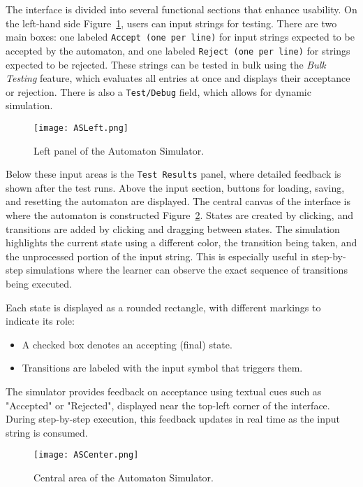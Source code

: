The interface is divided into several functional sections that enhance usability. 
On the left-hand side Figure~\ref{fig:automaton-simulator-left-panel}, users can input strings for testing. 
There are two main boxes: one labeled \texttt{Accept (one per line)} for input strings expected to be accepted by the automaton, 
and one labeled \texttt{Reject (one per line)} for strings expected to be rejected. 
These strings can be tested in bulk using the \textit{Bulk Testing} feature, which evaluates all entries at once and displays their acceptance or rejection.
There is also a \texttt{Test/Debug} field, which allows for dynamic simulation.

\begin{figure}[H]
  \centering
  \texttt{[image: ASLeft.png]}
  \caption{Left panel of the Automaton Simulator.}
  \label{fig:automaton-simulator-left-panel}
\end{figure}

Below these input areas is the \texttt{Test Results} panel, where detailed feedback is shown after the test runs. 
Above the input section, buttons for loading, saving, and resetting the automaton are displayed. 
The central canvas of the interface is where the automaton is constructed Figure~\ref{fig:automaton-simulator-center}. States are created by clicking, and transitions are added by clicking and dragging between states. 
The simulation highlights the current state using a different color, the transition being taken, and the unprocessed portion of the input string. 
This is especially useful in step-by-step simulations where the learner can observe the exact sequence of transitions being executed.

Each state is displayed as a rounded rectangle, with different markings to indicate its role:
\begin{itemize}
  \item A checked box denotes an accepting (final) state.
  \item Transitions are labeled with the input symbol that triggers them.
\end{itemize}

The simulator provides feedback on acceptance using textual cues such as "Accepted" or "Rejected", displayed near the top-left corner of the interface. 
During step-by-step execution, this feedback updates in real time as the input string is consumed.

\begin{figure}[H]
  \centering
  \texttt{[image: ASCenter.png]}
  \caption{Central area of the Automaton Simulator.}
  \label{fig:automaton-simulator-center}
\end{figure}

